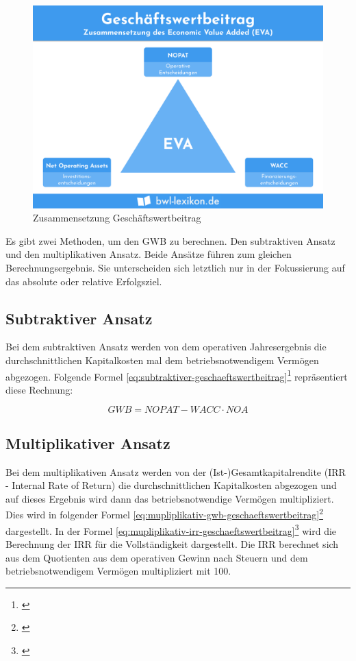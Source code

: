\begin{figure}[!h]
    \includegraphics[width=\linewidth]{./media/economic-value-added.png}
    \caption{Zusammensetzung Geschäftswertbeitrag}
    \label{fig:zsmgeschaeftswertbeitrag}
\end{figure}

Es gibt zwei Methoden, um den GWB zu berechnen. Den subtraktiven Ansatz und den multiplikativen Ansatz. Beide Ansätze führen zum gleichen Berechnungsergebnis. Sie unterscheiden sich letztlich nur in der Fokussierung auf das absolute oder relative Erfolgsziel.

\subsection{Subtraktiver Ansatz}

Bei dem subtraktiven Ansatz werden von dem operativen Jahresergebnis die durchschnittlichen Kapitalkosten mal dem betriebsnotwendigem Vermögen abgezogen. Folgende Formel \eqref{eq:subtraktiver-geschaeftswertbeitrag}\footnote{\cite{wikipedia-eva}} repräsentiert diese Rechnung:

\begin{equation}
    GWB = NOPAT - WACC \cdot NOA
    \label{eq:subtraktiver-geschaeftswertbeitrag}
\end{equation}

\subsection{Multiplikativer Ansatz}

Bei dem multiplikativen Ansatz werden von der (Ist-)Gesamtkapitalrendite (IRR - Internal Rate of Return) die durchschnittlichen Kapitalkosten abgezogen und auf dieses Ergebnis wird dann das betriebsnotwendige Vermögen multipliziert. Dies wird in folgender Formel \eqref{eq:mupliplikativ-gwb-geschaeftswertbeitrag}\footnote{\cite{wikipedia-eva}} dargestellt. In der Formel \eqref{eq:mupliplikativ-irr-geschaeftswertbeitrag}\footnote{\cite{controllingportal-eva}} wird die Berechnung der IRR für die Vollständigkeit dargestellt. Die IRR berechnet sich aus dem Quotienten aus dem operativen Gewinn nach Steuern und dem betriebsnotwendigem Vermögen multipliziert mit 100.

